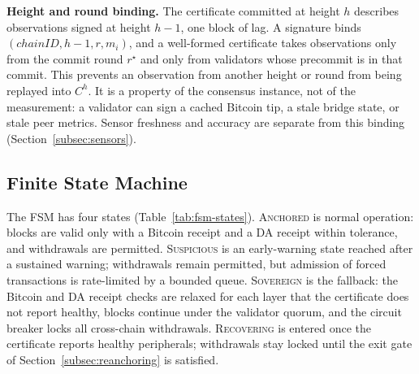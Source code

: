 \textbf{Height and round binding.} The certificate committed at height $h$
describes observations signed at height $h{-}1$, one block of lag. A
signature binds $(\mathit{chainID}, h{-}1, r, m_i)$, and a well-formed
certificate takes observations only from the commit round $r^{\star}$ and
only from validators whose precommit is in that commit.
This prevents an observation from another height or round from being
replayed into $C^{h}$. It is a property of the consensus instance, not of the
measurement: a validator can sign a cached Bitcoin tip, a stale bridge state,
or stale peer metrics. Sensor freshness and accuracy are separate from this
binding (Section~\ref{subsec:sensors}).

\subsection{Finite State Machine}
\label{subsec:fsm}

The FSM has four states (Table~\ref{tab:fsm-states}). \textsc{Anchored} is
normal operation: blocks are valid only with a Bitcoin receipt and a DA
receipt within tolerance, and withdrawals are permitted.
\textsc{Suspicious} is an early-warning state reached after a sustained
warning; withdrawals remain permitted, but admission of forced transactions
is rate-limited by a bounded queue. \textsc{Sovereign} is the fallback: the
Bitcoin and DA receipt checks are relaxed for each layer that the certificate
does not report healthy, blocks continue under the validator quorum, and the
circuit breaker locks all cross-chain withdrawals. \textsc{Recovering} is
entered once the certificate reports healthy peripherals; withdrawals stay
locked until the exit gate of Section~\ref{subsec:reanchoring} is satisfied.

